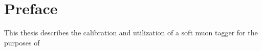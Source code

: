 \thispagestyle{empty}
\vspace{1cm}
\chapter*{Preface}
This thesis describes the calibration and utilization of a soft muon tagger for the purposes of 